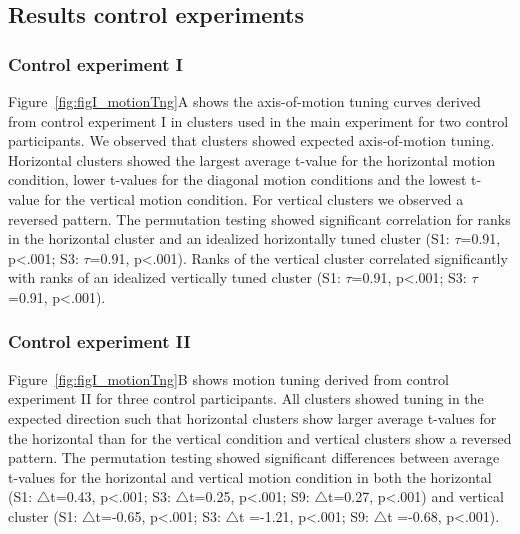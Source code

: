 \subsection{Results control experiments}
\subsubsection{Control experiment I}
Figure~\ref{fig:figI_motionTng}A shows the axis-of-motion tuning curves derived from control experiment I in clusters used in the main experiment for two control participants. We observed that clusters showed expected axis-of-motion tuning. Horizontal clusters showed the largest average t-value for the horizontal motion condition, lower t-values for the diagonal motion conditions and the lowest t-value for the vertical motion condition. For vertical clusters we observed a reversed pattern. The permutation testing showed significant correlation for ranks in the horizontal cluster and an idealized horizontally tuned cluster (S1: $\tau$=0.91, p\textless.001; S3: $\tau$=0.91, p\textless.001). Ranks of the vertical cluster correlated significantly with ranks of an idealized vertically tuned cluster (S1: $\tau$=0.91, p\textless.001; S3: $\tau$=0.91, p\textless.001).

\subsubsection{Control experiment II}
Figure~\ref{fig:figI_motionTng}B shows motion tuning derived from control experiment II for three control participants. All clusters showed tuning in the expected direction such that horizontal clusters show larger average t-values for the horizontal than for the vertical condition and vertical clusters show a reversed pattern. The permutation testing showed significant differences between average t-values for the horizontal and vertical motion condition in both the horizontal (S1: $\bigtriangleup$t=0.43, p\textless.001; S3: $\bigtriangleup$t=0.25, p\textless.001; S9: $\bigtriangleup$t=0.27, p\textless.001) and vertical cluster (S1: $\bigtriangleup$t=-0.65, p\textless.001; S3: $\bigtriangleup$t =-1.21, p\textless.001; S9: $\bigtriangleup$t =-0.68, p\textless.001).

